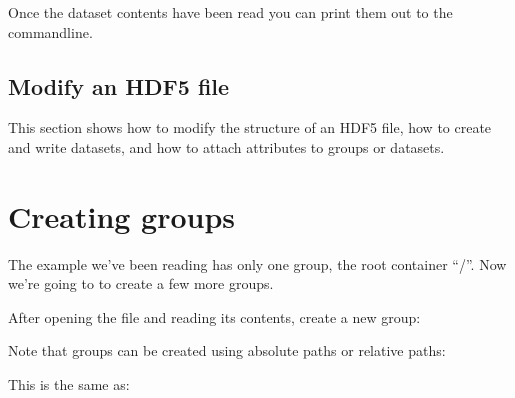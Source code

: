 \documentclass[letterpaper,10pt,english]{sphinxmanual}
\begin{document}
\sphinxAtStartPar
Once the dataset contents have been read you can print them out to the commandline.


\section{Modify an HDF5 file}
\label{\detokenize{index:modify-an-hdf5-file}}
\sphinxAtStartPar
This section shows how to modify the structure of an HDF5 file, how to create and write datasets, and how to attach
attributes to groups or datasets.


\chapter{Creating groups}
\label{\detokenize{index:creating-groups}}
\sphinxAtStartPar
The example we’ve been reading has only one group, the root container “/”. Now we’re going to to create a few more groups.

\sphinxAtStartPar
After opening the file and reading its contents, create a new group:

\begin{sphinxVerbatim}[commandchars=\\\{\}]
      
\end{sphinxVerbatim}

\sphinxAtStartPar
Note that groups can be created using absolute paths or relative paths:

\begin{sphinxVerbatim}[commandchars=\\\{\}]
      
\end{sphinxVerbatim}

\sphinxAtStartPar
This is the same as:

\begin{sphinxVerbatim}[commandchars=\\\{\}]
      
\end{sphinxVerbatim}
\end{document}
